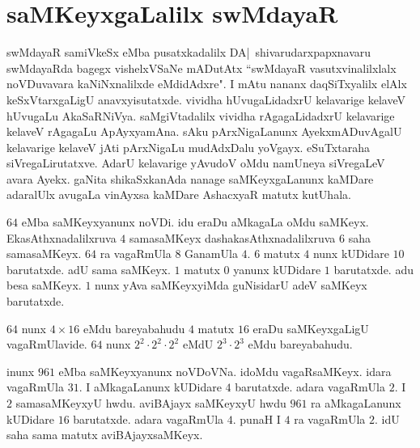 \chapter{saMKeyxgaLalilx swMdayaR}

swMdayaR samiVkeSx eMba pusatxkadalilx DA|~shivarudarxpapxnavaru swMdayaRda bagegx vishelxVSaNe mADutAtx ``swMdayaR vasutxvinalilxlalx noVDuvavara kaNiNxnalilxde eMdidAdxre". I mAtu nananx daqSiTxyalilx elAlx keSxVtarxgaLigU anavxyisutatxde. vividha hUvugaLidadxrU kelavarige kelaveV hUvugaLu AkaSaRNiVya. saMgiVtadalilx vividha rAgagaLidadxrU kelavarige kelaveV rAgagaLu ApAyxyamAna. sAku pArxNigaLanunx AyekxmADuvAgalU kelavarige kelaveV jAti pArxNigaLu mudAdxDalu yoVgayx. eSuTxtaraha siVregaLirutatxve. AdarU kelavarige yAvudoV oMdu namUneya siVregaLeV avara Ayekx. gaNita shikaSxkanAda nanage saMKeyxgaLanunx kaMDare adaralUlx avugaLa vinAyxsa kaMDare AshacxyaR matutx kutUhala.

$64$ eMba saMKeyxyanunx noVDi. idu eraDu aMkagaLa oMdu saMKeyx. EkasAthxna\-dalilxruva $4$ samasaMKeyx dashakasAthxnadalilxruva $6$ saha samasaMKeyx. $64$ ra vagaRmUla $8$ GanamUla $4$. $6$ matutx $4$ nunx kUDidare $10$ barutatxde. adU sama saMKeyx. $1$ matutx $0$ yanunx kUDidare $1$ barutatxde. adu besa saMKeyx. $1$ nunx yAva saMKeyxyiMda guNisidarU adeV saMKeyx barutatxde.

$64$ nunx $4\times 16$ eMdu bareyabahudu $4$ matutx $16$ eraDu saMKeyxgaLigU vagaRmUlavide. $64$ nunx $2^2\cdot 2^2\cdot 2^2$ eMdU $2^3\cdot2^3$ eMdu bareyabahudu.

inunx $961$ eMba saMKeyxyanunx noVDoVNa. idoMdu vagaRsaMKeyx. idara vagaRmUla $31$. I aMkagaLanunx kUDidare $4$ barutatxde. adara vagaRmUla $2$. I $2$ samasaMKeyxyU hwdu. aviBAjayx saMKeyxyU hwdu $961$ ra aMkagaLanunx kUDidare $16$ barutatxde. adara vagaRmUla $4$. punaH I $4$ ra vagaRmUla $2$. idU saha sama matutx aviBAjayxsaMKeyx.

